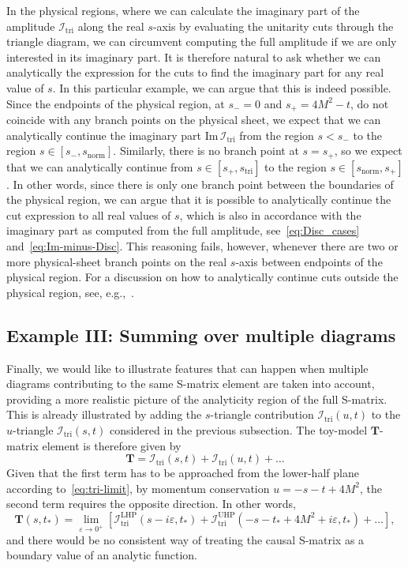 \documentclass[12pt]{article}
\numberwithin{figure}{section}
\def \be {\begin{equation}}
\def \ee {\end{equation}}
\def \eps {\varepsilon}
\def \I {\mathcal{I}}
\def \Im {\mathrm{Im}}
\def \triangle {\mathrm{tri}}
\def \normal {\mathrm{norm}}
\def \T {\mathbf{T}}
\def \UHP {\mathrm{UHP}}
\def \LHP {\mathrm{LHP}}
\newcommand{\mc}[1]{\mathcal{#1}}
\begin{document}
    In the physical regions, where we can calculate the imaginary part of the amplitude $\mc{I}_{\triangle}$ along the real $s$-axis by evaluating the unitarity cuts through the triangle diagram, we can circumvent computing the full amplitude if we are only interested in its imaginary part. It is therefore natural to ask whether we can analytically the expression for the cuts to find the imaginary part for any real value of $s$. In this particular example, we can argue that this is indeed possible.
    Since the endpoints of the physical region, at $s_- = 0$ and $s_+ = 4 M^2- t$, do not coincide with any branch points on the physical sheet, we expect that we can analytically continue the imaginary part $\Im \, \I_{\triangle}$ from the region $s<s_-$ to the region $s \in [s_-, s_\normal]$. Similarly, there is no branch point at $s=s_+$, so we expect that we can analytically continue from $s \in [s_+, s_\triangle]$ to the region $s \in [s_\normal, s_+]$. In other words, since there is only one branch point between the boundaries of the physical region, we can argue that it is possible to analytically continue the cut expression to all real values of $s$, which is also in accordance with the imaginary part as computed from the full amplitude, see~\eqref{eq:Disc_cases} and~\eqref{eq:Im-minus-Disc}. This reasoning fails, however, whenever there are two or more physical-sheet branch points on the real $s$-axis between endpoints of the physical region. For a discussion on how to analytically continue cuts outside the physical region, see, e.g.,~\cite{PhysRevLett.4.84,Goddard1969,doi:10.1063/1.1665233,doi:10.1063/1.1703897}.
    
	
	\subsection{\label{sec:ExampleIII}Example III: Summing over multiple diagrams}
	
	Finally, we would like to illustrate features that can happen when multiple diagrams contributing to the same S-matrix element are taken into account, providing a more realistic picture of the analyticity region of the full S-matrix. This is already illustrated by adding the $s$-triangle contribution $\I_\triangle(u,t)$ to the $u$-triangle $\I_\triangle(s,t)$ considered in the previous subsection. The toy-model $\T$-matrix element is therefore given by
	\be
	\T = \I_{\triangle}(s,t) + \I_{\triangle}(u,t) + \ldots
	\ee
	Given that the first term has to be approached from the lower-half plane according to~\eqref{eq:tri-limit}, by momentum conservation $u = -s-t+4M^2$, the second term requires the opposite direction. In other words,
	\be
	\T(s,t_\ast) = \lim_{\eps \to 0^+} \left[ \I^{\LHP}_{\triangle}(s - i\eps,t_\ast) + \I^{\UHP}_{\triangle}({-}s{-}t_\ast{+}4M^2 + i\eps,t_\ast) + \ldots \right],
	\ee
	and there would be no consistent way of treating the causal S-matrix as a boundary value of an analytic function.
	
\end{document}
